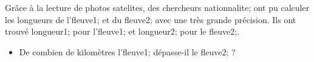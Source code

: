 \documentclass[exercice]{thedocument}%
\begin{document}
%
    Grâce à la lecture de photos satelites, des chercheurs \<nationnalite; ont pu
    calculer les longueurs de l'\<fleuve1; et du \<fleuve2; avec une très grande précision.
    Ils ont trouvé \<longueur1; pour l'\<fleuve1; et \<longueur2; pour le \<fleuve2;.
    \begin{itemize}
        \item De combien de kilomètres l'\<fleuve1; dépasse-il le \<fleuve2; ?
    \end{itemize}
\end{document}
